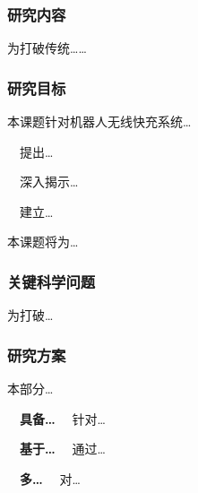 \justifying
\NSFCBodyText

\subsubsection{研究内容}


\indent
为打破传统\dots\dots

\subsubsection{研究目标}

本课题针对机器人无线快充系统\dots

~~提出\dots
	
~~深入揭示\dots
	
~~建立\dots

本课题将为\dots

\subsubsection{关键科学问题}

为打破\dots

\subsubsection{研究方案}

\label{sec:process_1}

本部分\dots

~~\textbf{具备\dots}~~
针对\dots

~~\textbf{基于\dots}~~
通过\dots

~~\textbf{多\dots}~~
对\dots